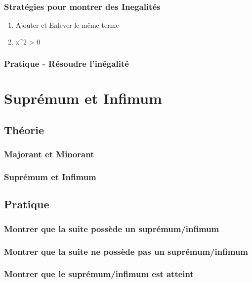 \documentclass{article}
\begin{document}
\subsubsection{Stratégies pour montrer des Inegalités}

    \begin{enumerate}
	\item Ajouter et Enlever le même terme
	\item x^2 > 0
    \end{enumerate}

\subsubsection{Pratique - Résoudre l'inégalité}

\section{Suprémum et Infimum}

\subsection{Théorie}

\subsubsection{Majorant et Minorant}

\subsubsection{Suprémum et Infimum}

\subsection{Pratique}

\subsubsection{Montrer que la suite possède un suprémum/infimum}

\subsubsection{Montrer que la suite ne possède pas un suprémum/infimum}

\subsubsection{Montrer que le suprémum/infimum est atteint}
\end{document}
